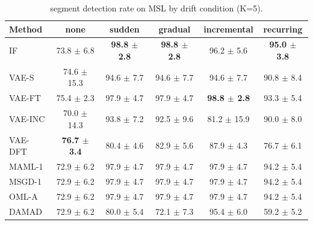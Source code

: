 \begin{table}[t]
\centering
\small
\caption{segment detection rate on MSL by drift condition (K=5).}
\label{tab:drift_segment_detection_rate_msl}
\begin{tabular}{lccccc}
\toprule
Method & none & sudden & gradual & incremental & recurring \\
\midrule
IF & 73.8 $\pm$ 6.8 & \textbf{98.8 $\pm$ 2.8} & \textbf{98.8 $\pm$ 2.8} & 96.2 $\pm$ 5.6 & \textbf{95.0 $\pm$ 3.8} \\
VAE-S & 74.6 $\pm$ 15.3 & 94.6 $\pm$ 7.7 & 94.6 $\pm$ 7.7 & 94.6 $\pm$ 7.7 & 90.8 $\pm$ 8.4 \\
VAE-FT & 75.4 $\pm$ 2.3 & 97.9 $\pm$ 4.7 & 97.9 $\pm$ 4.7 & \textbf{98.8 $\pm$ 2.8} & 93.3 $\pm$ 5.4 \\
VAE-INC & 70.0 $\pm$ 14.3 & 93.8 $\pm$ 7.2 & 92.5 $\pm$ 9.6 & 81.2 $\pm$ 15.9 & 90.0 $\pm$ 8.0 \\
VAE-DFT & \textbf{76.7 $\pm$ 3.4} & 80.4 $\pm$ 4.6 & 82.9 $\pm$ 5.6 & 87.9 $\pm$ 4.3 & 76.7 $\pm$ 6.1 \\
MAML-1 & 72.9 $\pm$ 6.2 & 97.9 $\pm$ 4.7 & 97.9 $\pm$ 4.7 & 97.9 $\pm$ 4.7 & 94.2 $\pm$ 5.4 \\
MSGD-1 & 72.9 $\pm$ 6.2 & 97.9 $\pm$ 4.7 & 97.9 $\pm$ 4.7 & 97.9 $\pm$ 4.7 & 94.2 $\pm$ 5.4 \\
OML-A & 72.9 $\pm$ 6.2 & 97.9 $\pm$ 4.7 & 97.9 $\pm$ 4.7 & 97.9 $\pm$ 4.7 & 94.2 $\pm$ 5.4 \\
DAMAD & 72.9 $\pm$ 6.2 & 80.0 $\pm$ 5.4 & 72.1 $\pm$ 7.3 & 95.4 $\pm$ 6.0 & 59.2 $\pm$ 5.2 \\
\bottomrule
\end{tabular}
\end{table}

